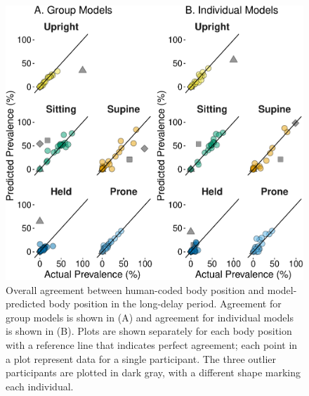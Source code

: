 \documentclass[
  man]{apa6}
\begin{document}
\begin{figure}

{\centering \includegraphics{manuscript_files/figure-latex/part2overall-1} 

}

\caption{Overall agreement between human-coded body position and model-predicted body position in the long-delay period. Agreement for group models is shown in (A) and agreement for individual models is shown in (B). Plots are shown separately for each body position with a reference line that indicates perfect agreement; each point in a plot represent data for a single participant. The three outlier participants are plotted in dark gray, with a different shape marking each individual.}\label{fig:part2overall}
\end{figure}
\end{document}
